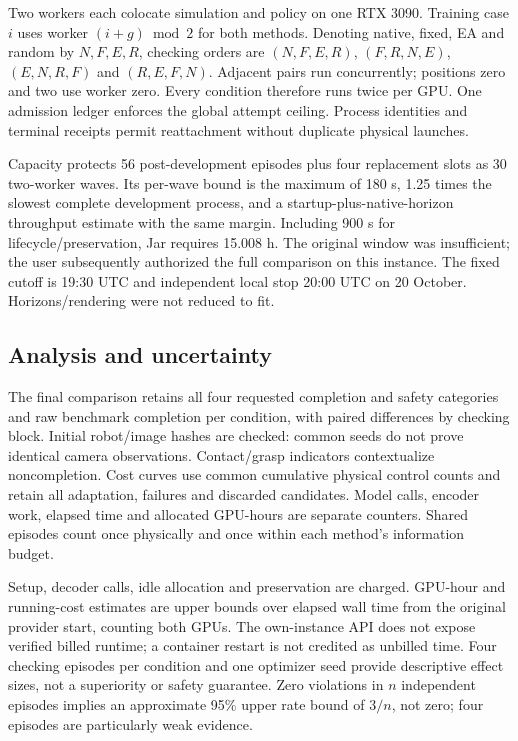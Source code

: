 \documentclass[sigconf,dvipsnames,balance=false]{acmart}
\begin{document}
Two workers each colocate simulation and policy on one RTX 3090. Training case
$i$ uses worker $(i+g)\bmod2$ for both methods. Denoting native, fixed, EA and
random by $N,F,E,R$, checking orders are $(N,F,E,R)$, $(F,R,N,E)$,
$(E,N,R,F)$ and $(R,E,F,N)$. Adjacent pairs run concurrently; positions zero and two
use worker zero. Every condition therefore runs twice per GPU. One admission
ledger enforces the global attempt ceiling. Process identities and terminal
receipts permit reattachment without duplicate physical launches.

Capacity protects 56 post-development episodes plus four replacement slots as 30
two-worker waves. Its per-wave bound is the maximum of 180 s, 1.25 times the
slowest complete development process, and a startup-plus-native-horizon throughput
estimate with the same margin. Including 900 s for lifecycle/preservation, Jar
requires 15.008 h. The original window was insufficient; the user subsequently
authorized the full comparison on this instance. The fixed cutoff is 19:30 UTC
and independent local stop 20:00 UTC on 20 October. Horizons/rendering were not
reduced to fit.

\subsection{Analysis and uncertainty}
The final comparison retains all four requested completion and safety categories
and raw benchmark completion per condition, with paired differences by checking
block. Initial robot/image hashes are checked: common seeds do not prove identical
camera observations. Contact/grasp indicators contextualize noncompletion.
Cost curves use common cumulative physical control counts and retain all adaptation,
failures and discarded candidates. Model calls, encoder work, elapsed time and
allocated GPU-hours are separate counters. Shared episodes count once physically
and once within each method's information budget.

Setup, decoder calls, idle allocation and preservation are charged. GPU-hour and
running-cost estimates are upper bounds over elapsed wall time from the original
provider start, counting both GPUs. The own-instance API does not expose verified
billed runtime; a container restart is not credited as unbilled time. Four checking episodes
per condition and one optimizer seed provide descriptive effect sizes, not a
superiority or safety guarantee. Zero violations in $n$ independent episodes
implies an approximate 95\% upper rate bound of $3/n$, not zero; four episodes
are particularly weak evidence.
\end{document}
